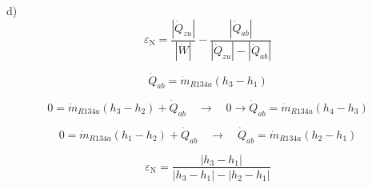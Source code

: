 d) 
\[
\varepsilon_{\text{N}} = \frac{| \dot{Q}_{zu} |}{| \dot{W} |} - \frac{| \dot{Q}_{ab} |}{| \dot{Q}_{zu} | - | \dot{Q}_{ab} |}
\]

\[
\dot{Q}_{ab} = \dot{m}_{R134a} (h_3 - h_1)
\]

\[
0 = \dot{m}_{R134a} (h_3 - h_2) + \dot{Q}_{ab} \quad \rightarrow \quad 0 \rightarrow \dot{Q}_{ab} = \dot{m}_{R134a} (h_4 - h_3)
\]

\[
0 = \dot{m}_{R134a} (h_1 - h_2) + \dot{Q}_{ab} \quad \rightarrow \quad \dot{Q}_{ab} = \dot{m}_{R134a} (h_2 - h_1)
\]

\[
\varepsilon_{\text{N}} = \frac{| h_3 - h_1 |}{| h_3 - h_1 | - | h_2 - h_1 |}
\]